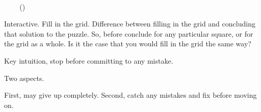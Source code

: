 \begin{note}
  \begin{illustration}
    \label{illu:gist:sudoku}

    \mbox{ }\hfill%
    \begin{adjustbox}{minipage=0.45\linewidth,scale=1}
      \centering
    \end{adjustbox}%
    \begin{adjustbox}{minipage=0.45\linewidth,scale=1}
      \centering
    \end{adjustbox}%
    \hfill\mbox{ }\newline
    \mbox{ }\newline
    \mbox{ }\hfill(\cite[84,85]{Coussement:2007up})\newline
  \end{illustration}

  Interactive.
  Fill in the grid.
  Difference between filling in the grid and concluding that solution to the puzzle.
  So, before conclude for any particular square, or for the grid as a whole.
  Is it the case that you would fill in the grid the same way?

  Key intuition, stop before committing to any mistake.

  Two aspects.

  First, may give up completely.
  Second, catch any mistakes and fix before moving on.
\end{note}


